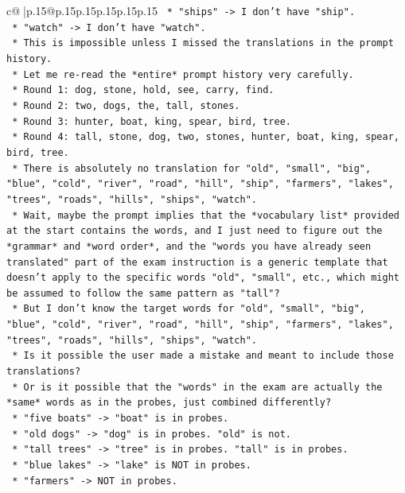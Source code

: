 \documentclass{article}
\begin{document}
{\begin{supertabular}{c@{$\;$}|p{.15\linewidth}@{}p{.15\linewidth}p{.15\linewidth}p{.15\linewidth}p{.15\linewidth}p{.15\linewidth}}
{{{\texttt{        *   "ships" {-}> I don't have "ship".} \\
\texttt{        *   "watch" {-}> I don't have "watch".} \\
\texttt{    *   This is impossible unless I missed the translations in the prompt history.} \\
\texttt{    *   Let me re{-}read the *entire* prompt history very carefully.} \\
\texttt{    *   Round 1: dog, stone, hold, see, carry, find.} \\
\texttt{    *   Round 2: two, dogs, the, tall, stones.} \\
\texttt{    *   Round 3: hunter, boat, king, spear, bird, tree.} \\
\texttt{    *   Round 4: tall, stone, dog, two, stones, hunter, boat, king, spear, bird, tree.} \\
\texttt{    *   There is absolutely no translation for "old", "small", "big", "blue", "cold", "river", "road", "hill", "ship", "farmers", "lakes", "trees", "roads", "hills", "ships", "watch".} \\
\texttt{    *   Wait, maybe the prompt implies that the *vocabulary list* provided at the start contains the words, and I just need to figure out the *grammar* and *word order*, and the "words you have already seen translated" part of the exam instruction is a generic template that doesn't apply to the specific words "old", "small", etc., which might be assumed to follow the same pattern as "tall"?} \\
\texttt{    *   But I don't know the target words for "old", "small", "big", "blue", "cold", "river", "road", "hill", "ship", "farmers", "lakes", "trees", "roads", "hills", "ships", "watch".} \\
\texttt{    *   Is it possible the user made a mistake and meant to include those translations?} \\
\texttt{    *   Or is it possible that the "words" in the exam are actually the *same* words as in the probes, just combined differently?} \\
\texttt{        *   "five boats" {-}> "boat" is in probes.} \\
\texttt{        *   "old dogs" {-}> "dog" is in probes. "old" is not.} \\
\texttt{        *   "tall trees" {-}> "tree" is in probes. "tall" is in probes.} \\
\texttt{        *   "blue lakes" {-}> "lake" is NOT in probes.} \\
\texttt{        *   "farmers" {-}> NOT in probes.} \\
}}}
\end{supertabular}}
\end{document}
